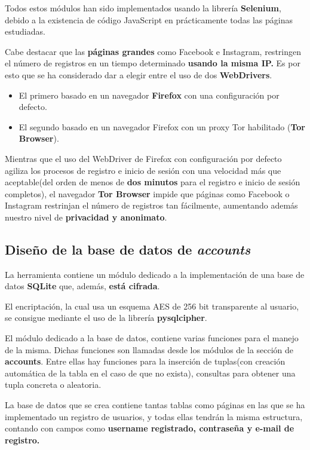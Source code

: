 Todos estos módulos han sido implementados usando la librería \textbf{Selenium}, debido a la existencia de código JavaScript en prácticamente todas las páginas estudiadas. 

Cabe destacar que las \textbf{páginas grandes} como Facebook e Instagram, restringen el número de registros en un tiempo determinado \textbf{usando la misma IP.} Es por esto que se ha considerado dar a elegir entre el uso de dos \textbf{WebDrivers}. 

\begin{itemize}
	\item El primero basado en un navegador \textbf{Firefox} con una configuración por defecto.
	\item El segundo basado en un navegador Firefox con un proxy Tor habilitado (\textbf{Tor Browser}).
\end{itemize} 

Mientras que el uso del WebDriver de Firefox con configuración por defecto agiliza los procesos de registro e inicio de sesión con una velocidad más que aceptable(del orden de menos de\textbf{ dos minutos} para el registro e inicio de sesión completos), el navegador \textbf{Tor Browser} impide que páginas como Facebook o Instagram restrinjan el número de registros tan fácilmente, aumentando además nuestro nivel de \textbf{privacidad y anonimato}.

\subsection{Diseño de la base de datos de \textit{accounts}}

La herramienta contiene un módulo dedicado a la implementación de una base de datos \textbf{SQLite }que, además, \textbf{está cifrada}.

El encriptación, la cual usa un esquema AES de 256 bit transparente al usuario, se consigue mediante el uso de la librería \textbf{pysqlcipher}.

El módulo dedicado a la base de datos, contiene varias funciones para el manejo de la misma. Dichas funciones son llamadas desde los módulos de la sección de \textbf{accounts}. Entre ellas hay funciones para la inserción de tuplas(con creación automática de la tabla en el caso de que no exista), consultas para obtener una tupla concreta o aleatoria.

La base de datos que se crea contiene tantas tablas como páginas en las que se ha implementado un registro de usuarios, y todas ellas tendrán la misma estructura, contando con campos como \textbf{username registrado, contraseña y e-mail de registro.}

